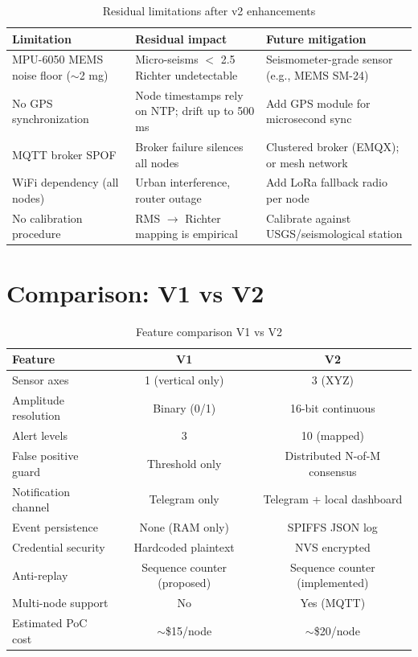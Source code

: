 \documentclass[11pt,a4paper]{article}
\begin{document}
\begin{table}[h!]
\centering
\begin{tabular}{p{4.5cm}p{4.5cm}p{4cm}}
\toprule
\textbf{Limitation} & \textbf{Residual impact} & \textbf{Future mitigation} \\
\midrule
MPU-6050 MEMS noise floor ($\sim$2 mg) & Micro-seisms $<$ 2.5 Richter undetectable & Seismometer-grade sensor (e.g., MEMS SM-24) \\
No GPS synchronization & Node timestamps rely on NTP; drift up to 500 ms & Add GPS module for microsecond sync \\
MQTT broker SPOF & Broker failure silences all nodes & Clustered broker (EMQX); or mesh network \\
WiFi dependency (all nodes) & Urban interference, router outage & Add LoRa fallback radio per node \\
No calibration procedure & RMS $\to$ Richter mapping is empirical & Calibrate against USGS/seismological station \\
\bottomrule
\end{tabular}
\caption{Residual limitations after v2 enhancements}
\end{table}

\section{Comparison: V1 vs V2}

\begin{table}[h!]
\centering
\begin{tabular}{lcc}
\toprule
\textbf{Feature} & \textbf{V1} & \textbf{V2} \\
\midrule
Sensor axes & 1 (vertical only) & 3 (XYZ) \\
Amplitude resolution & Binary (0/1) & 16-bit continuous \\
Alert levels & 3 & 10 (mapped) \\
False positive guard & Threshold only & Distributed N-of-M consensus \\
Notification channel & Telegram only & Telegram + local dashboard \\
Event persistence & None (RAM only) & SPIFFS JSON log \\
Credential security & Hardcoded plaintext & NVS encrypted \\
Anti-replay & Sequence counter (proposed) & Sequence counter (implemented) \\
Multi-node support & No & Yes (MQTT) \\
Estimated PoC cost & $\sim$\$15/node & $\sim$\$20/node \\
\bottomrule
\end{tabular}
\caption{Feature comparison V1 vs V2}
\end{table}
\end{document}
